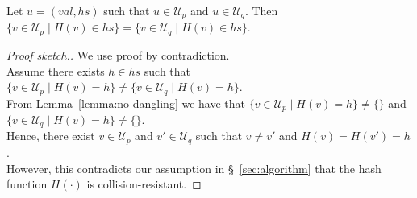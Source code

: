 \documentclass[manuscript,anonymous]{acmart}
\begin{document}
\begin{lemma}\label{lemma:no-collision}
Let $u = (\mathit{val}, \mathit{hs})$ such that $u \in \mathcal{U}_p$ and $u \in \mathcal{U}_q$.
Then $\{v \in \mathcal{U}_p \mid H(v) \in \mathit{hs}\} = \{v \in \mathcal{U}_q \mid H(v) \in \mathit{hs}\}$.
\end{lemma}
\begin{proof}[Proof sketch.]
We use proof by contradiction.\\
Assume there exists $h \in \mathit{hs}$ such that $\{v \in \mathcal{U}_p \mid H(v) = h\} \neq \{v \in \mathcal{U}_q \mid H(v) = h\}$.\\
From Lemma~\ref{lemma:no-dangling} we have that $\{v \in \mathcal{U}_p \mid H(v) = h\} \neq \{\}$ and $\{v \in \mathcal{U}_q \mid H(v) = h\} \neq \{\}$.\\
Hence, there exist $v \in \mathcal{U}_p$ and $v' \in \mathcal{U}_q$ such that $v \neq v'$ and $H(v) = H(v') = h$.\\
However, this contradicts our assumption in \S~\ref{sec:algorithm} that the hash function $H(\cdot)$ is collision-resistant.
\end{proof}
\end{document}
